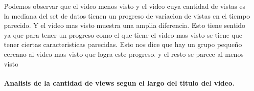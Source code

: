             \begin{figure}[ht]
            \end{figure}
        \FloatBarrier
        Podemos observar que el video menos visto y el video cuya cantidad de
        vistas es la mediana del set de datos tienen un progreso de variacion de
        vistas en el tiempo parecido. Y el video mas visto muestra una amplia
        diferencia. Esto tiene sentido ya que para tener un progreso como el que
        tiene el video mas visto se tiene que tener ciertas caracteristicas
        parecidas. Esto nos dice que hay un grupo pequeño cercano al video mas
        visto que logra este progreso. y el resto se parece al menos visto
        \newpage

        \paragraph{Analisis de la cantidad de views segun el largo del titulo del video.}

